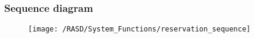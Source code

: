 \newpage
\subsubsection{Sequence diagram}
\begin{figure}[!ht]
  \centering
  \vspace{0.2cm}
  \texttt{[image: /RASD/System\_Functions/reservation\_sequence]}\\
  \vspace{0.1cm}
  \label{fig:reservation_sequence} 
\end{figure}

